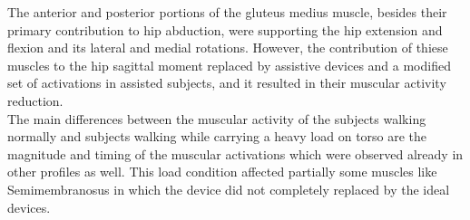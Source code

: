\documentclass[10pt,letterpaper]{article}
\begin{document}
The anterior and posterior portions of the gluteus medius muscle, besides their primary contribution to hip abduction, were supporting the hip extension and flexion and its lateral and medial rotations. However, the contribution of thiese muscles to the hip sagittal moment replaced by assistive devices and a modified set of activations in assisted subjects, and it resulted in their muscular activity reduction.\\
The main differences between the muscular activity of the subjects walking normally and subjects walking while carrying a heavy load on torso are the magnitude and timing of the muscular activations which were observed already in other profiles as well. This load condition affected partially some muscles like Semimembranosus in which the device did not completely replaced by the ideal devices.
\end{document}
